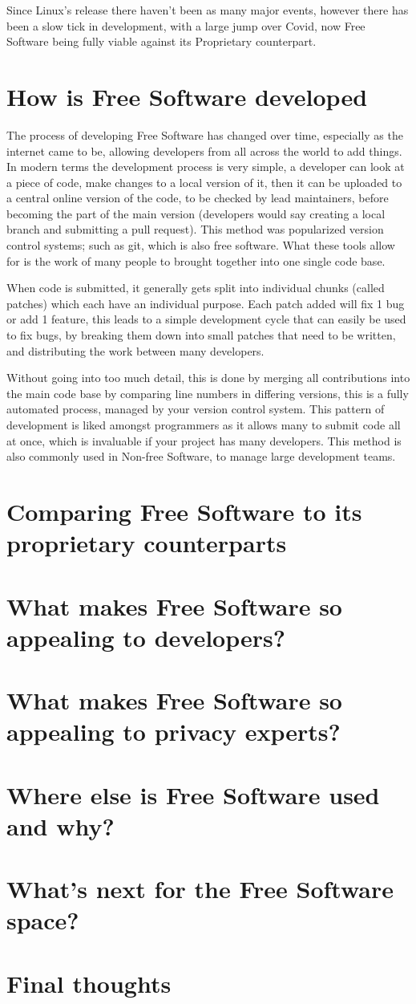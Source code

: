 \documentclass[a4paper,12pt]{article}
\begin{document}
{Since Linux's release there haven't been as many major events, however there has been a slow tick
in development, with a large jump over Covid, now Free Software being fully viable against
its Proprietary counterpart.

\section{How is Free Software developed}
The process of developing Free Software has changed over time, especially as the internet came to be,
allowing developers from all across the world to add things. In modern terms the development process is 
very simple, a developer can look at a piece of code, make changes to a local version of it, then it 
can be uploaded to a central online version of the code, to be checked by lead maintainers, before becoming
the part of the main version (developers would say creating a local branch and submitting a pull request). 
This method was popularized version control systems; such as git\cite{GIT}, which is also free software. 
What these tools allow for is the work of many people to brought together into one single code base.

When code is submitted, it generally gets split into individual chunks (called patches) which each
have an individual purpose. Each patch added will fix 1 bug or add 1 feature, this leads to a simple
development cycle that can easily be used to fix bugs, by breaking them down into small patches that
need to be written, and distributing the work between many developers. 

Without going into too much detail, this is done by merging all contributions into the main code base
by comparing line numbers in differing versions, this is a fully automated process, managed by your
version control system. This pattern of development is liked amongst programmers as it allows many 
to submit code all at once, which is invaluable if your project has many developers. This method
is also commonly used in Non-free Software, to manage large development teams\cite{NONFREEvcs}.

\section{Comparing Free Software to its proprietary counterparts}
\section{What makes Free Software so appealing to developers?}
\section{What makes Free Software so appealing to privacy experts?}
\section{Where else is Free Software used and why?}
\section{What's next for the Free Software space?}
\section{Final thoughts}

\newpage
\printbibliography
}
\end{document}
